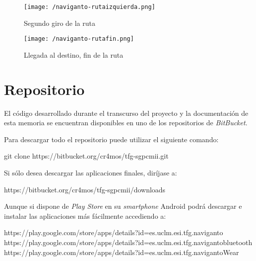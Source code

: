 \begin{figure}[!h]
  \begin{minipage}[b]{0.5\linewidth}
    \begin{center}
      \texttt{[image: /naviganto-rutaizquierda.png]}
      \caption{Segundo giro de la ruta}
      \label{fig:navigantoRutaSegundoGiro}
    \end{center}
  \end{minipage}
  \begin{minipage}[b]{0.5\linewidth}
    \begin{center}
      \texttt{[image: /naviganto-rutafin.png]}
      \caption{Llegada al destino, fin de la ruta}
      \label{fig:navigantoRutaFin}
    \end{center}
  \end{minipage}
\end{figure}

\newpage %
\section{Repositorio}

El código desarrollado durante el transcurso del proyecto y la documentación de esta memoria se
encuentran disponibles en uno de los repositorios de \emph{BitBucket}.

Para descargar todo el repositorio puede utilizar el siguiente comando:

\begin{listing}[
  float=ht,
  language = Bash]
git clone https://bitbucket.org/cr4mos/tfg-sgpcmii.git
\end{listing}

Si sólo desea descargar las aplicaciones finales, diríjase a:

\begin{listing}
https://bitbucket.org/cr4mos/tfg-sgpcmii/downloads
\end{listing}

Aunque si dispone de \emph{Play Store} en su \emph{smartphone} Android podrá descargar e instalar
las aplicaciones más fácilmente accediendo a:

\begin{listing}[
 basicstyle = \scriptsize\lstfont,
]
https://play.google.com/store/apps/details?id=es.uclm.esi.tfg.naviganto
https://play.google.com/store/apps/details?id=es.uclm.esi.tfg.navigantobluetooth
https://play.google.com/store/apps/details?id=es.uclm.esi.tfg.navigantoWear
\end{listing}

